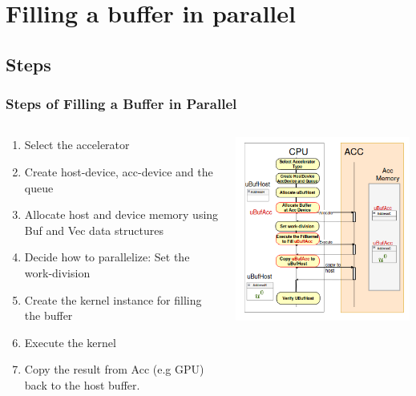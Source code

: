 \documentclass[9pt]{beamer}
\begin{document}
\section{Filling a buffer in parallel}
\subsection{Steps}
\begin{frame}
\frametitle{Steps of Filling a Buffer in Parallel}
\begin{columns}

    \begin{column}{0.55\textwidth} %
    \begin{enumerate}
     \item Select the accelerator
     \item Create host-device, acc-device and the queue
     \item Allocate host and device memory using Buf and Vec data structures
     \item Decide how to parallelize: Set the work-division
     \item Create the kernel instance for filling the buffer
     \item Execute the kernel
     \item Copy the result from Acc (e.g GPU) back to the host buffer.
    \end{enumerate}
    \end{column}

    \begin{column}{0.45\textwidth} %
        \centering
        \includegraphics[width=\linewidth]{Screenshot from 2024-10-20 23-39-02.png} %
    \end{column}


\end{columns}
\end{frame}
\end{document}
